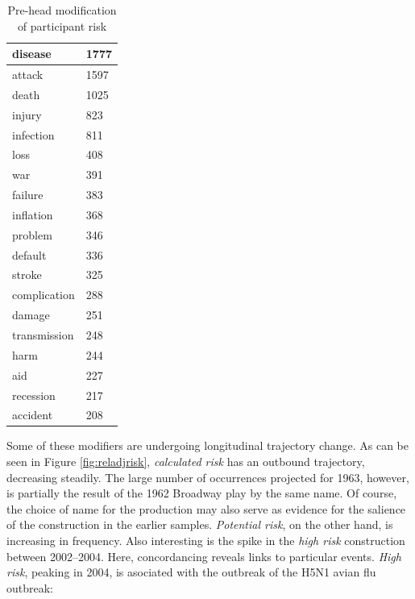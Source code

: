 \begin{table}
{\begin{minipage}{0.35\textwidth}
\begin{tabular}{|l|l|}
    disease            & 1777  \\ \hline
    attack             & 1597  \\ \hline
    death              & 1025  \\ \hline
    injury             & 823   \\ \hline
    infection          & 811   \\ \hline
    loss               & 408   \\ \hline
    war                & 391   \\ \hline
    failure            & 383   \\ \hline
    inflation          & 368   \\ \hline
    problem            & 346   \\ \hline
    default            & 336   \\ \hline
    stroke             & 325   \\ \hline
    complication       & 288   \\ \hline
    damage             & 251   \\ \hline
    transmission       & 248   \\ \hline
    harm               & 244   \\ \hline
    aid                & 227   \\ \hline
    recession          & 217   \\ \hline
    accident           & 208   \\ \hline
    \end{tabular}
    \caption{Pre-head modification of participant risk}
    \label{tab:posthead}
    \end{minipage}}
    \end{table}

    Some of these modifiers are undergoing longitudinal trajectory change. As can be seen in Figure \ref{fig:reladjrisk}, \emph{calculated risk} has an outbound trajectory, decreasing steadily. The large number of occurrences projected for 1963, however, is partially the result of the 1962 Broadway play by the same name. Of course, the choice of name for the production may also serve as evidence for the salience of the construction in the earlier samples.  \emph{Potential risk}, on the other hand, is increasing in frequency. Also interesting is the spike in the \emph{high risk} construction between 2002--2004. Here, concordancing reveals links to particular events. \emph{High risk}, peaking in 2004, is asociated with the outbreak of the H5N1 avian flu outbreak: 

